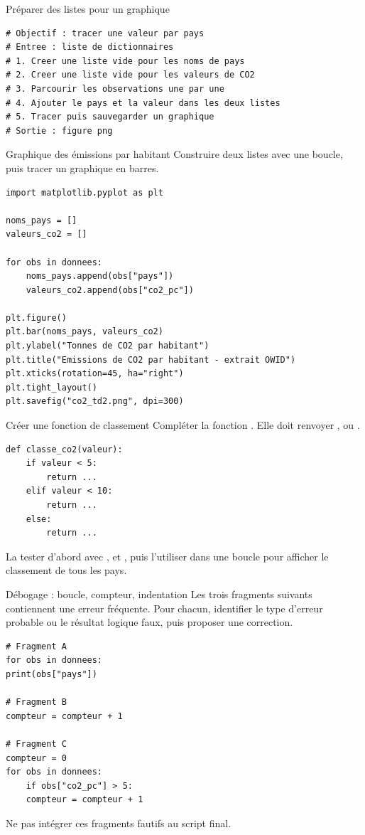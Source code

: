 \documentclass[11pt,a4paper]{article}
\begin{document}
\begin{pseudocodeexercise}{Préparer des listes pour un graphique}
\begin{lstlisting}
# Objectif : tracer une valeur par pays
# Entree : liste de dictionnaires
# 1. Creer une liste vide pour les noms de pays
# 2. Creer une liste vide pour les valeurs de CO2
# 3. Parcourir les observations une par une
# 4. Ajouter le pays et la valeur dans les deux listes
# 5. Tracer puis sauvegarder un graphique
# Sortie : figure png
\end{lstlisting}
\end{pseudocodeexercise}

\begin{mandatoryexercise}{Graphique des émissions par habitant}
Construire deux listes avec une boucle, puis tracer un graphique en barres.
\begin{lstlisting}
import matplotlib.pyplot as plt

noms_pays = []
valeurs_co2 = []

for obs in donnees:
    noms_pays.append(obs["pays"])
    valeurs_co2.append(obs["co2_pc"])

plt.figure()
plt.bar(noms_pays, valeurs_co2)
plt.ylabel("Tonnes de CO2 par habitant")
plt.title("Emissions de CO2 par habitant - extrait OWID")
plt.xticks(rotation=45, ha="right")
plt.tight_layout()
plt.savefig("co2_td2.png", dpi=300)
\end{lstlisting}
\end{mandatoryexercise}

\begin{mandatoryexercise}{Créer une fonction de classement}
Compléter la fonction . Elle doit renvoyer ,  ou .
\begin{lstlisting}
def classe_co2(valeur):
    if valeur < 5:
        return ...
    elif valeur < 10:
        return ...
    else:
        return ...
\end{lstlisting}
La tester d'abord avec ,  et , puis l'utiliser dans une boucle pour afficher le classement de tous les pays.
\end{mandatoryexercise}

\begin{mandatoryexercise}{Débogage : boucle, compteur, indentation}
Les trois fragments suivants contiennent une erreur fréquente. Pour chacun, identifier le type d'erreur probable ou le résultat logique faux, puis proposer une correction.
\begin{lstlisting}
# Fragment A
for obs in donnees:
print(obs["pays"])

# Fragment B
compteur = compteur + 1

# Fragment C
compteur = 0
for obs in donnees:
    if obs["co2_pc"] > 5:
    compteur = compteur + 1
\end{lstlisting}
Ne pas intégrer ces fragments fautifs au script final.
\end{mandatoryexercise}
\end{document}
